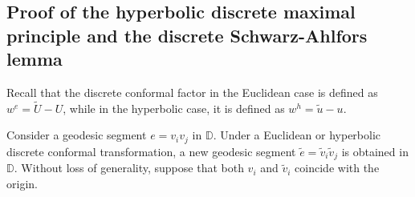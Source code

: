 \documentclass[12pt]{amsart}
\theoremstyle{definition}
\newtheorem{theorem}{Theorem}[section]
\def\qed{\hfill{Q.E.D.}\smallskip}
\begin{document}


\subsection{Proof of the hyperbolic discrete maximal principle and the discrete Schwarz-Ahlfors lemma}\label{Sec: key2}

Recall that the discrete conformal factor in the Euclidean case is defined as $w^e=\tilde{U}-U$,
while in the hyperbolic case, it is defined as $w^h=\tilde{u}-u$.

Consider a geodesic segment $e=v_iv_j$ in $\mathbb{D}$.
Under a Euclidean or hyperbolic discrete conformal transformation, a new geodesic segment $\tilde{e}=\tilde{v}_i\tilde{v}_j$ is obtained in $\mathbb{D}$.
Without loss of generality, suppose that both $v_i$ and $\tilde{v}_i$ coincide with the origin.
\end{document}

